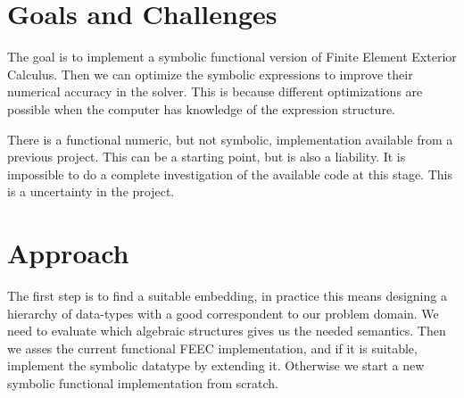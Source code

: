 \documentclass{scrartcl}
\begin{document}
\section{Goals and Challenges}

The goal is to implement a symbolic functional version of Finite
Element Exterior Calculus.  Then we can optimize the symbolic expressions to
improve their numerical accuracy in the solver. This is because
different optimizations are possible when the computer has knowledge
of the expression structure.



There is a functional numeric, but not symbolic, implementation
available from a previous project. This can be a starting point, but
is also a liability.  It is impossible to do a complete investigation
of the available code at this stage.  This is a uncertainty in the
project.


\section{Approach}


The first step is to find a suitable embedding, in practice this means
designing a hierarchy of data-types with a good correspondent to our problem
domain.  We need to evaluate which algebraic structures gives us the needed
semantics. Then we asses the current functional FEEC implementation, and if
it is suitable, implement the symbolic datatype by extending it. Otherwise we
start a new symbolic functional implementation from scratch.
\end{document}
